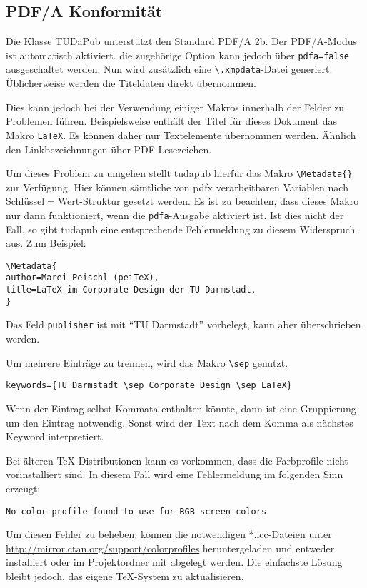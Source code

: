 \documentclass[
	german,%
	accentcolor=9c,%
]{tudapub}
\newcommand*{\code}[1]{\texttt{#1}}
\newcommand*{\pkg}[1]{\textsf{#1}}
\newcommand*{\cls}[1]{\textsf{#1}}
\begin{document}
\subsection{PDF/A Konformität}
Die Klasse TUDaPub unterstützt den Standard PDF/A 2b. Der PDF/A-Modus ist automatisch aktiviert. die zugehörige Option kann jedoch über \code{pdfa=false} ausgeschaltet werden.
Nun wird zusätzlich eine \code{\textbackslash.xmpdata}-Datei generiert. Üblicherweise werden die Titeldaten direkt übernommen.

Dies kann jedoch bei der Verwendung einiger Makros innerhalb der Felder zu Problemen führen. Beispielsweise enthält der Titel für dieses Dokument das Makro \code{\LaTeX}. Es können daher nur Textelemente übernommen werden. Ähnlich den Linkbezeichnungen über PDF-Lesezeichen.

Um dieses Problem zu umgehen stellt \cls{tudapub} hierfür das Makro \code{\textbackslash{}Metadata\{\}} zur Verfügung. Hier können sämtliche von \pkg{pdfx} verarbeitbaren Variablen nach Schlüssel$=$Wert-Struktur gesetzt werden. Es ist zu beachten, dass dieses Makro nur dann funktioniert, wenn die \code{pdfa}-Ausgabe aktiviert ist. Ist dies nicht der Fall, so gibt \cls{tudapub} eine entsprechende Fehlermeldung zu diesem Widerspruch aus.
Zum Beispiel:
\begin{verbatim}
\Metadata{
author=Marei Peischl (peiTeX),
title=LaTeX im Corporate Design der TU Darmstadt,
}
\end{verbatim}
Das Feld \code{publisher} ist mit \enquote{TU Darmstadt} vorbelegt, kann aber überschrieben werden.

Um mehrere Einträge zu trennen, wird das Makro \code{\textbackslash{}sep} genutzt.
\begin{verbatim}
keywords={TU Darmstadt \sep Corporate Design \sep LaTeX}
\end{verbatim}
Wenn der Eintrag selbst Kommata enthalten könnte, dann ist eine Gruppierung um den Eintrag notwendig. Sonst wird der Text nach dem Komma als nächstes Keyword interpretiert.


Bei älteren \TeX-Distributionen kann es vorkommen, dass die Farbprofile nicht vorinstalliert sind. In diesem Fall wird eine Fehlermeldung im folgenden Sinn erzeugt:
\begin{verbatim}
No color profile found to use for RGB screen colors
\end{verbatim}
Um diesen Fehler zu beheben, können die notwendigen *.icc-Dateien unter \url{http://mirror.ctan.org/support/colorprofiles} heruntergeladen und entweder installiert oder im Projektordner mit abgelegt werden. Die einfachste Lösung bleibt jedoch, das eigene \TeX-System zu aktualisieren.
\end{document}
